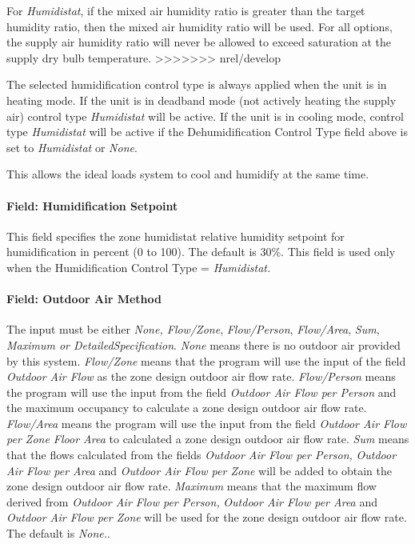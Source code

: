 For \emph{Humidistat}, if the mixed air humidity ratio is greater than the target humidity ratio, then the mixed air humidity ratio will be used. For all options, the supply air humidity ratio will never be allowed to exceed saturation at the supply dry bulb temperature.
>>>>>>> nrel/develop

The selected humidification control type is always applied when the unit is in heating mode. If the unit is in deadband mode (not actively heating the supply air) control type \emph{Humidistat} will be active. If the unit is in cooling mode, control type \emph{Humidistat} will be active if the Dehumidification Control Type field above is set to \emph{Humidistat} or \emph{None}.

This allows the ideal loads system to cool and humidify at the same time.

\paragraph{Field: Humidification Setpoint}\label{field-humidification-setpoint}

This field specifies the zone humidistat relative humidity setpoint for humidification in percent (0 to 100). The default is 30\%. This field is used only when the Humidification Control Type = \emph{Humidistat.}

\paragraph{Field: Outdoor Air Method}\label{field-outdoor-air-method-000}

The input must be either \emph{None, Flow/Zone}, \emph{Flow/Person}, \emph{Flow/Area}, \emph{Sum}, \emph{Maximum or DetailedSpecification}. \emph{None} means there is no outdoor air provided by this system. \emph{Flow/Zone} means that the program will use the input of the field \emph{Outdoor Air Flow} as the zone design outdoor air flow rate. \emph{Flow/Person} means the program will use the input from the field \emph{Outdoor Air Flow per Person} and the maximum occupancy to calculate a zone design outdoor air flow rate. \emph{Flow/Area} means the program will use the input from the field \emph{Outdoor Air Flow per Zone Floor Area} to calculated a zone design outdoor air flow rate. \emph{Sum} means that the flows calculated from the fields \emph{Outdoor Air Flow per Person,} \emph{Outdoor Air Flow per Area} and \emph{Outdoor Air Flow per Zone} will be added to obtain the zone design outdoor air flow rate. \emph{Maximum} means that the maximum flow derived from \emph{Outdoor Air Flow per Person,} \emph{Outdoor Air Flow per Area} and \emph{Outdoor Air Flow per Zone} will be used for the zone design outdoor air flow rate. The default is \emph{None.}.

